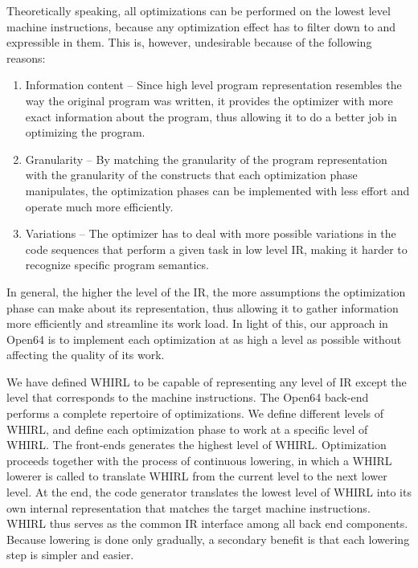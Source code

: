 \documentclass{article}
\begin{document}
Theoretically speaking, all optimizations can be performed on the
lowest level machine instructions, because any optimization effect
has to filter down to and expressible in them. This is, however, undesirable
because of the following reasons: 

\begin{enumerate}
\item
Information content -- Since
high level program representation resembles the way the original
program was written, it provides the optimizer with more exact
information about the program, thus allowing it to do a better job
in optimizing the program.

\item Granularity -- By matching the granularity of the program
representation with the granularity of the constructs that each
optimization phase manipulates, the optimization phases can be
implemented with less effort and operate much more efficiently.

\item Variations -- The optimizer has to deal with more possible
variations in the code sequences that perform a given task in low
level IR, making it harder to recognize specific program semantics.
\end{enumerate}

In general, the higher the level of the IR, the more assumptions
the optimization phase can make about its representation, thus
allowing it to gather information more efficiently and streamline
its work load. In light of this, our approach in Open64 is to
implement each optimization at as high a level as possible without
affecting the quality of its work. 

We have defined WHIRL to be
capable of representing any level of IR except the level that
corresponds to the machine instructions. The Open64 back-end
performs a complete repertoire of optimizations. We define different
levels of WHIRL, and define each optimization phase to work at a
specific level of WHIRL. The front-ends generates the highest level
of WHIRL. Optimization proceeds together with the process of
continuous lowering, in which a WHIRL lowerer is called to translate WHIRL from the current level to the next lower level. At the end, the code generator
translates the lowest level of WHIRL into its own internal representation that
matches the target machine instructions. WHIRL thus serves as the common IR interface among all back end components. Because lowering is done only gradually, 
a secondary benefit is that each lowering step is simpler and easier.
\end{document}
